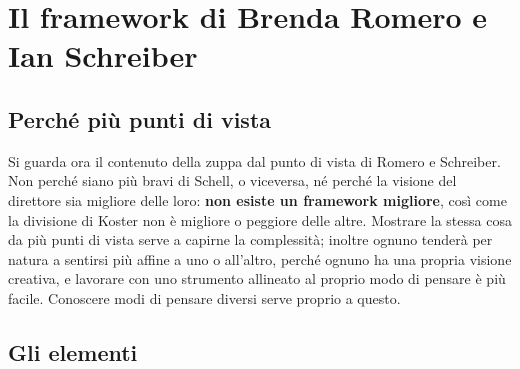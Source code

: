 \section{Il framework di Brenda Romero e Ian Schreiber}
\label{sec:romero-schreiber}

\subsection{Perché più punti di vista}

Si guarda ora il contenuto della zuppa dal punto di vista di Romero e
Schreiber. Non perché siano più bravi di Schell, o viceversa, né perché la
visione del direttore sia migliore delle loro: \textbf{non esiste un framework
migliore}, così come la divisione di Koster non è migliore o peggiore delle
altre. Mostrare la stessa cosa da più punti di vista serve a capirne la
complessità; inoltre ognuno tenderà per natura a sentirsi più affine a uno o
all'altro, perché ognuno ha una propria visione creativa, e lavorare con uno
strumento allineato al proprio modo di pensare è più facile. Conoscere modi di
pensare diversi serve proprio a questo.

\subsection{Gli elementi}



